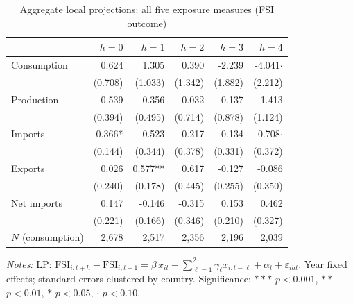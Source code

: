 
\begin{table}[htbp]
\centering
\caption{Aggregate local projections: all five exposure measures (FSI outcome)}
\label{tab:agg-lp}
\begin{threeparttable}
\small
\begin{tabular}{lrrrrr}
\toprule
  & $h=0$ & $h=1$ & $h=2$ & $h=3$ & $h=4$ \\
\midrule
Consumption & 0.624 & 1.305 & 0.390 & -2.239 & -4.041$\cdot$ \\
   & (0.708) & (1.033) & (1.342) & (1.882) & (2.212) \\[4pt]
Production & 0.539 & 0.356 & -0.032 & -0.137 & -1.413 \\
   & (0.394) & (0.495) & (0.714) & (0.878) & (1.124) \\[4pt]
Imports & 0.366* & 0.523 & 0.217 & 0.134 & 0.708$\cdot$ \\
   & (0.144) & (0.344) & (0.378) & (0.331) & (0.372) \\[4pt]
Exports & 0.026 & 0.577** & 0.617 & -0.127 & -0.086 \\
   & (0.240) & (0.178) & (0.445) & (0.255) & (0.350) \\[4pt]
Net imports & 0.147 & -0.146 & -0.315 & 0.153 & 0.462 \\
   & (0.221) & (0.166) & (0.346) & (0.210) & (0.327) \\[4pt]
\midrule
$N$ (consumption) & 2,678 & 2,517 & 2,356 & 2,196 & 2,039 \\
\bottomrule
\end{tabular}
\begin{tablenotes}\small
\item \textit{Notes:} LP: $\text{FSI}_{i,t+h} - \text{FSI}_{i,t-1} = \beta\, x_{it} + \sum_{\ell=1}^{2}\gamma_\ell x_{i,t-\ell} + \alpha_t + \varepsilon_{iht}$. Year fixed effects; standard errors clustered by country. Significance: $***$ $p<0.001$, $**$ $p<0.01$, $*$ $p<0.05$, $\cdot$ $p<0.10$.
\end{tablenotes}
\end{threeparttable}
\end{table}
